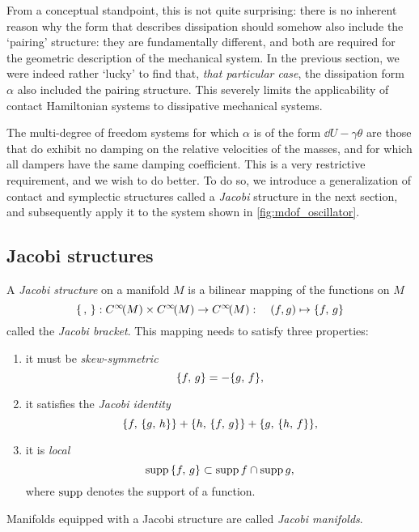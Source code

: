 From a conceptual standpoint, this is not quite surprising: there is no inherent reason why the form that describes dissipation should somehow also include the `pairing' structure: they are fundamentally different, and both are required for the geometric description of the mechanical system. In the previous section, we were indeed rather `lucky' to find that, \emph{that particular case}, the dissipation form \(\alpha\) also included the pairing structure. This severely limits the applicability of contact Hamiltonian systems to dissipative mechanical systems.

The multi-degree of freedom systems for which \( \alpha \) is of the form \(\dd{U} - \gamma \theta\) are those that do exhibit no damping on the relative velocities of the masses, and for which all dampers have the same damping coefficient. This is a very restrictive requirement, and we wish to do better. To do so, we introduce a generalization of contact and symplectic structures called a \emph{Jacobi} structure in the next section, and subsequently apply it to the system shown in \cref{fig:mdof_oscillator}.

\subsection{Jacobi structures}
A \emph{Jacobi structure} on a manifold \(M\) is a bilinear mapping of the functions on \(M\) \cite{marle1991}
\begin{equation}
     \{\,,\,\}: C^\infty\!\qty(M)\times C^\infty\!\qty(M) \to C^\infty\!\qty(M): \quad (f, g) \mapsto \{f,\,g\}
\end{equation}
called the \emph{Jacobi bracket}. This mapping needs to satisfy three properties:
\begin{enumerate}[label=(\roman*), noitemsep]
    \item it must be \emph{skew-symmetric}
        \begin{equation}
     \{f,\,g\} = -\{g,\,f\},
\end{equation}
    \item it satisfies the \emph{Jacobi identity}
        \begin{equation}
     \{f,\,\{g,\,h\}\} + \{h,\,\{f,\,g\}\} + \{g,\,\{h,\,f\}\},
\end{equation}
    \item it is \emph{local}
        \begin{equation}
     \operatorname{supp}{\{f,\,g\}} \subset \operatorname{supp}{f} \cap \operatorname{supp}{g},
\end{equation}
        where \(\operatorname{supp}\) denotes the support of a function.
\end{enumerate}
Manifolds equipped with a Jacobi structure are called \emph{Jacobi manifolds}.

